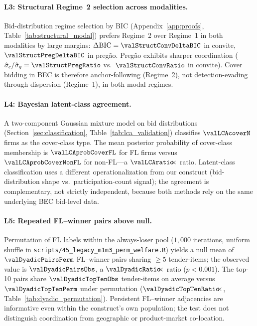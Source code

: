 \paragraph{L3: Structural Regime~2 selection across modalities.}
Bid-distribution regime selection by BIC (Appendix~\ref{app:proofs},
Table~\ref{tab:structural_modal}) prefers Regime~2 over Regime~1
in both modalities by large margins: $\Delta\mathrm{BIC}=\valStructConvDeltaBIC$
in convite, $\valStructPregDeltaBIC$ in pregão. Pregão exhibits
sharper coordination ($\hat{\sigma}_c/\hat{\sigma}_g = \valStructPregRatio$
vs.\ $\valStructConvRatio$ in convite). Cover bidding in BEC is
therefore anchor-following (Regime~2), not detection-evading
through dispersion (Regime~1), in both modal regimes.

\paragraph{L4: Bayesian latent-class agreement.}
A two-component Gaussian mixture model on bid distributions
(Section~\ref{sec:classification},
Table~\ref{tab:lca_validation}) classifies $\valLCAcoverN$ firms as
the cover-class type. The mean posterior probability of cover-class
membership is $\valLCAprobCoverFL$ for FL firms versus
$\valLCAprobCoverNonFL$ for non-FL---a $\valLCAratio\!\!\times$ ratio.
Latent-class classification uses a different operationalization
from our construct (bid-distribution shape vs.\ participation-count
signal); the agreement is complementary, not strictly independent,
because both methods rely on the same underlying BEC bid-level
data.

\paragraph{L5: Repeated FL--winner pairs above null.}
Permutation of FL labels within the always-loser pool ($1{,}000$
iterations, uniform shuffle in
\texttt{scripts/45\_legacy\_m1m3\_perm\_welfare.R}) yields a null
mean of $\valDyadicPairsPerm$ FL--winner pairs sharing $\geq 5$
tender-items; the observed value is $\valDyadicPairsObs$, a
$\valDyadicRatio\!\!\times$ ratio ($p < 0.001$). The top-10 pairs
share $\valDyadicTopTenObs$ tender-items on average versus
$\valDyadicTopTenPerm$ under permutation
($\valDyadicTopTenRatio\!\!\times$,
Table~\ref{tab:dyadic_permutation}). Persistent FL--winner
adjacencies are informative even within the construct's own
population; the test does not distinguish coordination from
geographic or product-market co-location.

